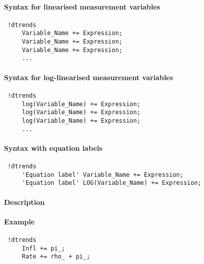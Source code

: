 


	\paragraph{Syntax for linearised measurement variables}
 
 \begin{verbatim}
 !dtrends
     Variable_Name += Expression;
     Variable_Name += Expression;
     Variable_Name += Expression;
     ...
 \end{verbatim}
 
 \paragraph{Syntax for log-linearised measurement variables}
 
 \begin{verbatim}
 !dtrends
     log(Variable_Name) += Expression;
     log(Variable_Name) += Expression;
     log(Variable_Name) += Expression;
     ...
 \end{verbatim}
 
 \paragraph{Syntax with equation labels}
 
 \begin{verbatim}
 !dtrends
     'Equation label' Variable_Name += Expression;
     'Equation label' LOG(Variable_Name) += Expression;
 \end{verbatim}
 
 \paragraph{Description}
 
 \paragraph{Example}
 
 \begin{verbatim}
 !dtrends
     Infl += pi_;
     Rate += rho_ + pi_;
 \end{verbatim}



